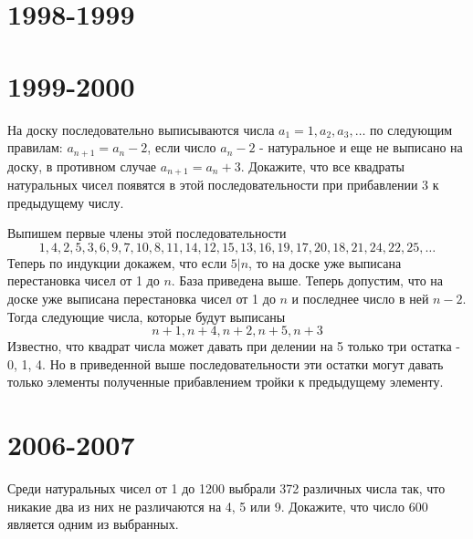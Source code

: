 \documentclass[11pt, a4paper]{template}
\begin{document}
\chapter{1998-1999}

\chapter{1999-2000}

\begin{exercise}
На доску последовательно выписываются числа $a_{1} = 1, a_{2}, a_{3}, \dots$ по следующим правилам: $a_{n + 1} = a_{n} - 2$, если число $a_{n} - 2$ - натуральное и еще не выписано на доску, в противном случае $a_{n + 1} = a_{n} + 3$. Докажите, что все квадраты натуральных чисел появятся в этой последовательности при прибавлении 3 к предыдущему числу.
\end{exercise}

\begin{solution}
Выпишем первые члены этой последовательности
$$
1, 4, 2, 5, 3, 6, 9, 7, 10, 8, 11, 14, 12, 15, 13, 16, 19, 17, 20, 18, 21, 24, 22, 25, \dots
$$
Теперь по индукции докажем, что если $5 | n$, то на доске уже выписана перестановка чисел от 1 до $n$. База приведена выше. Теперь допустим, что на доске уже выписана перестановка чисел от 1 до $n$ и последнее число в ней $n - 2$. Тогда следующие числа, которые будут выписаны
$$
n + 1, n + 4, n + 2, n + 5, n + 3
$$
Известно, что квадрат числа может давать при делении на 5 только три остатка - 0, 1, 4. Но в приведенной выше последовательности эти остатки могут давать только элементы полученные прибавлением тройки к предыдущему элементу.
\end{solution}

\chapter{2006-2007}

\begin{exercise}
Среди натуральных чисел от 1 до 1200 выбрали 372 различных числа так, что никакие два из них не различаются на 4, 5 или 9. Докажите, что число 600 является одним из выбранных.
\end{exercise}
\end{document}
